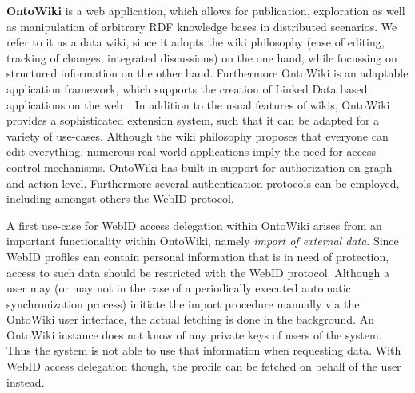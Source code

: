 \documentclass[a4paper]{llncs}
\begin{document}
\textbf{OntoWiki}
\cite{auer-s-2006-736-a} is a web application, which allows for publication, exploration as well as manipulation of arbitrary RDF knowledge bases in distributed scenarios.
We refer to it as a data wiki, since it adopts the wiki philosophy (ease of editing, tracking of changes, integrated discussions) on the one hand, while focussing on structured information on the other hand.
Furthermore OntoWiki is an adaptable application framework, which supports the creation of Linked Data based applications on the web~\cite{heino-n-2009-61-a}.
In addition to the usual features of wikis, OntoWiki provides a sophisticated extension system, such that it can be adapted for a variety of use-cases.
Although the wiki philosophy proposes that everyone can edit everything, numerous real-world applications imply the need for access-control mechanisms.
OntoWiki has built-in support for authorization on graph and action level.
Furthermore several authentication protocols can be employed, including amongst others the WebID protocol.


A first use-case for WebID access delegation within OntoWiki arises from an important functionality within OntoWiki, namely \textit{import of external data}.
Since WebID profiles can contain personal information that is in need of protection, access to such data should be restricted with the WebID protocol.
Although a user may (or may not in the case of a periodically executed automatic synchronization process) initiate the import procedure manually via the OntoWiki user interface, the actual fetching is done in the background.
An OntoWiki instance does not know of any private keys of users of the system.
Thus the system is not able to use that information when requesting data.
With WebID access delegation though, the profile can be fetched on behalf of the user instead.
\end{document}
